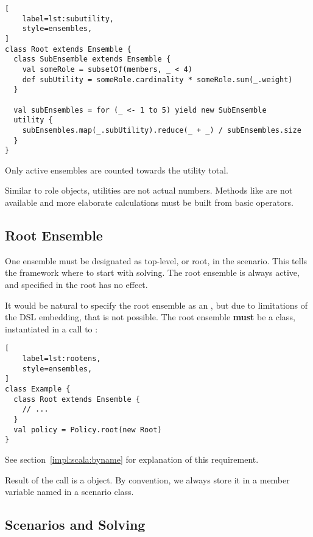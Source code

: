 \begin{lstlisting}[
    label=lst:subutility,
    style=ensembles,
]
class Root extends Ensemble {
  class SubEnsemble extends Ensemble {
    val someRole = subsetOf(members, _ < 4)
    def subUtility = someRole.cardinality * someRole.sum(_.weight)
  }

  val subEnsembles = for (_ <- 1 to 5) yield new SubEnsemble
  utility {
    subEnsembles.map(_.subUtility).reduce(_ + _) / subEnsembles.size
  }
}
\end{lstlisting}

Only active ensembles are counted towards the utility total.

Similar to role objects, utilities are not actual numbers. Methods like  are not
available and more elaborate calculations must be built from basic operators.


\subsection{Root Ensemble}
\label{dsl:c:root}

One ensemble must be designated as top-level, or root, in the scenario. This tells the
framework where to start with solving. The root ensemble is always active, and
 specified in the root has no effect.

It would be natural to specify the root ensemble as an , but due to
limitations of the DSL embedding, that is not possible. The root ensemble \textbf{must}
be a class, instantiated in a call to :

\begin{lstlisting}[
    label=lst:rootens,
    style=ensembles,
]
class Example {
  class Root extends Ensemble {
    // ...
  }
  val policy = Policy.root(new Root)
}
\end{lstlisting}

See section~\ref{impl:scala:byname} for explanation of this requirement.

Result of the  call is a  object. By convention, we always
store it in a member variable named  in a scenario class.


\subsection{Scenarios and Solving}
\label{dsl:c:solving}

